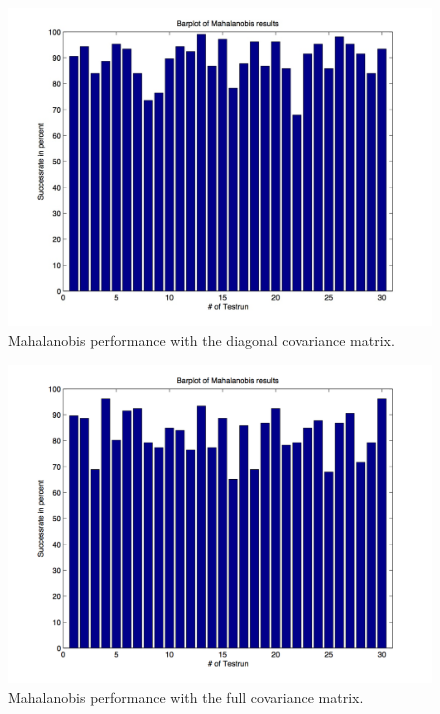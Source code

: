 \documentclass[subfigure,epsfig,fleqn,amssmb,float,caption,ausarbeitung]{scrartcl}
\begin{document}
\begin{figure}
	\centering
	\includegraphics[scale=0.75]{img/mahalanobis_results_diag_covmat.jpg}
	\caption{Mahalanobis performance with the diagonal covariance matrix.}
\end{figure}

\begin{figure}
	\centering
	\includegraphics[scale=0.75]{img/mahalanobis_results_full_covmat.jpg}
	\caption{Mahalanobis performance with the full covariance matrix.}
\end{figure}
\end{document}
